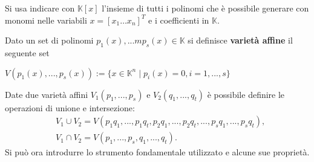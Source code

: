 \begin{defn}
	Si usa indicare con $\mathbb{K}[x]$ l'insieme di tutti i polinomi che è possibile generare con monomi nelle variabili $x = [x_1 \dots x_n]^T$ e i coefficienti in $\mathbb{K}$.
\end{defn}

\begin{defn}
	Dato un set di polinomi $p_1(x), ...m p_s(x) \in \mathbb{K}$ si definisce \textbf{varietà affine} il seguente set
	\begin{center}
		$V(p_1(x), ..., p_s(x)) := \{x \in \mathbb{K}^n  \; | \; p_i(x) = 0, i = 1, ..., s \}$
	\end{center} 
\end{defn}

Date due varietà affini $V_1(p_1, ..., p_s)$ e $V_2(q_1, ..., q_t)$ è possibile definire le operazioni di unione e intersezione:
\begin{align}
	\nonumber
	& V_1 \cup V_2 = V(p_1q_1, ...,p_1q_t, p_2q_1, ..., p_2q_t, ..., p_sq_1, ..., p_sq_t), \\
	\nonumber
	& V_1 \cap V_2 = V(p_1, ..., p_s, q_1, ..., q_t).
\end{align}
Si può ora introdurre lo strumento fondamentale utilizzato e alcune sue proprietà.
	
